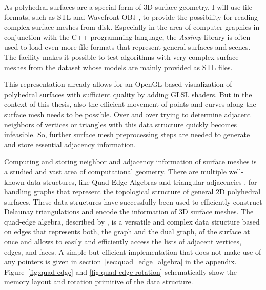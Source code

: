 \documentclass{stdlocal}
\begin{document}

  \noindent
  As polyhedral surfaces are a special form of 3D surface geometry, I will use file formats, such as STL \autocite{stl-file-format} and Wavefront OBJ \autocite{obj-file-format}, to provide the possibility for reading complex surface meshes from disk.
  Especially in the area of computer graphics in conjunction with the C++ programming language, the \textit{Assimp} library \autocite{assimp} is often used to load even more file formats that represent general surfaces and scenes.
  The facility makes it possible to test algorithms with very complex surface meshes from the  dataset whose models are mainly provided as STL files.

  This representation already allows for an OpenGL-based visualization of polyhedral surfaces with sufficient quality by adding GLSL shaders.
  But in the context of this thesis, also the efficient movement of points and curves along the surface mesh needs to be possible.
  Over and over trying to determine adjacent neighbors of vertices or triangles with this data structure quickly becomes infeasible.
  So, further surface mesh preprocessing steps are needed to generate and store essential adjacency information.

  Computing and storing neighbor and adjacency information of surface meshes is a studied and vast area of computational geometry.
  There are multiple well-known data structures, like Quad-Edge Algebras \autocite{guibas1985} and triangular adjacencies \autocite{shewchuk1996}, for handling graphs that represent the topological structure of general 2D polyhedral surfaces.
  These data structures have successfully been used to efficiently construct Delaunay triangulations and encode the information of 3D surface meshes.
  The quad-edge algebra, described by \textcite{guibas1985}, is a versatile and complex data structure based on edges that represents both, the graph and the dual graph, of the surface at once and allows to easily and efficiently access the lists of adjacent vertices, edges, and faces.
  A simple but efficient implementation that does not make use of any pointers is given in section~\ref{sec:quad_edge_algebra} in the appendix.
  Figure~\ref{fig:quad-edge} and \ref{fig:quad-edge-rotation} schematically show the memory layout and rotation primitive of the data structure.
\end{document}
